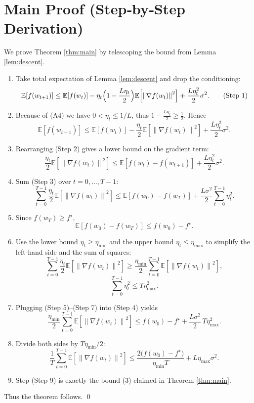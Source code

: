 \documentclass{article}
\newcommand{\EE}{\mathbb{E}}
\newcommand{\norm}[1]{\left\|#1\right\|}
\begin{document}
\section*{Main Proof (Step‑by‑Step Derivation)}
We prove Theorem \ref{thm:main} by telescoping the bound from Lemma \ref{lem:descent}.
\begin{enumerate}
\item Take total expectation of Lemma \ref{lem:descent} and drop the conditioning:
\[
\EE\!\left[f(w_{t+1})\right]
\le \EE\!\left[f(w_t)\right]
-\eta_t\Bigl(1-\frac{L\eta_t}{2}\Bigr)\EE\!\left[\norm{\nabla f(w_t)}^2\right]
+\frac{L\eta_t^2}{2}\sigma^2 .
\tag{Step 1}
\]
\item Because of (A4) we have $0<\eta_t\le 1/L$, thus $1-\frac{L\eta_t}{2}\ge \frac12$.
Hence
\[
\EE\!\left[f(w_{t+1})\right]
\le \EE\!\left[f(w_t)\right]
-\frac{\eta_t}{2}\EE\!\left[\norm{\nabla f(w_t)}^2\right]
+\frac{L\eta_t^2}{2}\sigma^2 .
\tag{Step 2}
\]
\item Rearranging (Step 2) gives a lower bound on the gradient term:
\[
\frac{\eta_t}{2}\EE\!\left[\norm{\nabla f(w_t)}^2\right]
\le \EE\!\left[f(w_t)-f(w_{t+1})\right]
+\frac{L\eta_t^2}{2}\sigma^2 .
\tag{Step 3}
\]
\item Sum (Step 3) over $t=0,\dots,T-1$:
\[
\sum_{t=0}^{T-1}\frac{\eta_t}{2}\EE\!\left[\norm{\nabla f(w_t)}^2\right]
\le \EE\!\left[f(w_0)-f(w_T)\right]
+\frac{L\sigma^2}{2}\sum_{t=0}^{T-1}\eta_t^2 .
\tag{Step 4}
\]
\item Since $f(w_T)\ge f^{\star}$,
\[
\EE\!\left[f(w_0)-f(w_T)\right]\le f(w_0)-f^{\star}.
\tag{Step 5}
\]
\item Use the lower bound $\eta_t\ge\eta_{\min}$ and the upper bound $\eta_t\le\eta_{\max}$
to simplify the left‑hand side and the sum of squares:
\[
\sum_{t=0}^{T-1}\frac{\eta_t}{2}\EE\!\left[\norm{\nabla f(w_t)}^2\right]
\ge \frac{\eta_{\min}}{2}\sum_{t=0}^{T-1}\EE\!\left[\norm{\nabla f(w_t)}^2\right],
\tag{Step 6}
\]
\[
\sum_{t=0}^{T-1}\eta_t^2\le T\eta_{\max}^2 .
\tag{Step 7}
\]
\item Plugging (Step 5)–(Step 7) into (Step 4) yields
\[
\frac{\eta_{\min}}{2}\sum_{t=0}^{T-1}\EE\!\left[\norm{\nabla f(w_t)}^2\right]
\le f(w_0)-f^{\star}
+\frac{L\sigma^2}{2}\,T\eta_{\max}^2 .
\tag{Step 8}
\]
\item Divide both sides by $T\eta_{\min}/2$:
\[
\frac{1}{T}\sum_{t=0}^{T-1}\EE\!\left[\norm{\nabla f(w_t)}^2\right]
\le \frac{2\bigl(f(w_0)-f^{\star}\bigr)}{\eta_{\min}T}
+L\eta_{\max}\sigma^2 .
\tag{Step 9}
\]
\item Step (Step 9) is exactly the bound (3) claimed in Theorem \ref{thm:main}.
\end{enumerate}
Thus the theorem follows. \qed
\end{document}
